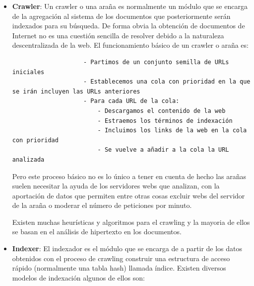 \documentclass[a4paper, 11pt]{article} %
\begin{document}
		\begin{itemize}
			\item \textbf{Crawler}: Un crawler o una araña es normalmente un módulo que se encarga de la agregación al sistema de los documentos que posteriormente serán indexados para su búsqueda. De forma obvia la obtención de documentos de Internet no es una cuestión sencilla de resolver debido a la naturaleza descentralizada de la web. El funcionamiento básico de un crawler o araña es:
				\begin{verbatim}
					- Partimos de un conjunto semilla de URLs iniciales
					- Establecemos una cola con prioridad en la que se irán incluyen las URLs anteriores
					- Para cada URL de la cola:
						- Descargamos el contenido de la web
						- Estraemos los términos de indexación
						- Incluimos los links de la web en la cola con prioridad
						- Se vuelve a añadir a la cola la URL analizada
				\end{verbatim}
				Pero este proceso básico no es lo único a tener en cuenta de hecho las arañas suelen necesitar la ayuda de los servidores webs que analizan, con la aportación de datos que permiten entre otras cosas excluir webs del servidor de la araña o moderar el número de peticiones por minuto.

				Existen muchas heurísticas y algoritmos para el crawling y la mayoria de ellos se basan en el análisis de hipertexto en los documentos.
			\item \textbf{Indexer}: El indexador es el módulo que se encarga de a partir de los datos obtenidos con el proceso de crawling construir una estructura de acceso rápido (normalmente una tabla hash) llamada índice. Existen diversos modelos de indexación algunos de ellos son:


\end{itemize}
\end{document}
